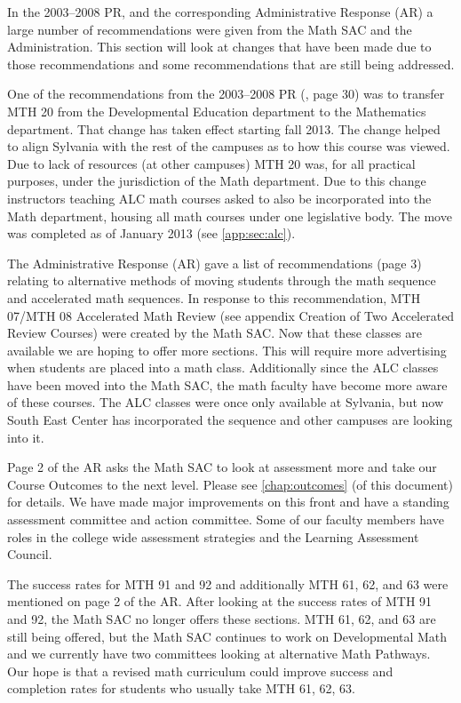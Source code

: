 In the 2003--2008 PR, and the corresponding Administrative
Response (AR) a large number of recommendations were given from the Math SAC and
the Administration.  This section will look at changes that have been made due
to those recommendations and some recommendations that are still being
addressed.

One of the recommendations from the 2003--2008 PR (\cite{mathprogramreview2003}, page 30) was to transfer MTH
20 from the Developmental Education department to the Mathematics department.
That change has taken effect starting fall 2013.  The change helped to align
Sylvania with the rest of the campuses as to how this course was viewed.   Due
to lack of resources (at other campuses) MTH 20 was, for all practical purposes,
under the jurisdiction of the Math department.  Due to this change instructors
teaching ALC math courses asked to also be incorporated into the Math
department, housing all math courses under one legislative body.  The move was
completed as of January 2013 (see \vref{app:sec:alc}).

The Administrative Response (AR) gave a list of recommendations (page 3) relating to alternative methods
of moving students through the math sequence and accelerated math sequences.  In
response to this recommendation, MTH 07/MTH 08 Accelerated Math Review (see appendix
 Creation of Two Accelerated Review Courses) were created by the Math SAC.
Now that these classes are available we are hoping to offer more sections.  This
will require more advertising when students are placed into a math class.
Additionally since the ALC classes have been moved into the Math SAC, the math
faculty have become more aware of these courses.  The ALC classes were once only
available at Sylvania, but now South East Center has incorporated the sequence
and other campuses are looking into it.

Page 2 of the AR asks the Math SAC to look at assessment more and take our
Course Outcomes to the next level.  Please see \vref{chap:outcomes} (of this
document) for
details.  We have made major improvements on this front and have a standing
assessment committee and action committee.  Some of our faculty members have
roles in the college wide assessment strategies and the Learning Assessment Council.

The success rates for MTH 91 and 92 and additionally MTH 61, 62, and 63 were
mentioned on page 2 of the AR.  After looking at the success rates of MTH 91 and
92, the Math SAC no longer offers these sections.   MTH 61, 62, and 63 are still
being offered, but the Math SAC continues to work on Developmental Math and we
currently have two committees looking at alternative Math Pathways. 
Our hope is that a revised math curriculum could improve success and completion rates for students who usually take MTH 61, 62, 63. 

